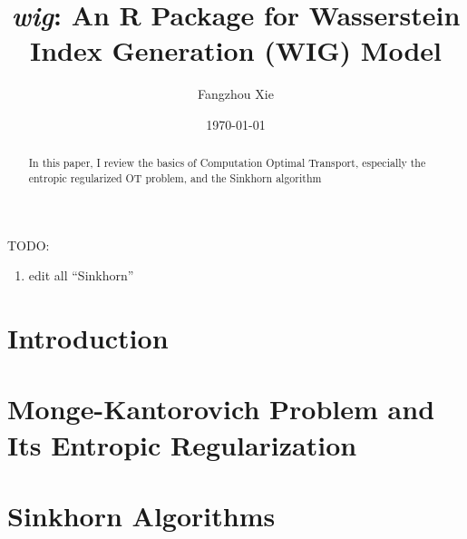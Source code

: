 \documentclass[oneside,12pt,letterpaper]{article}
\title{\textit{\textbf{wig}}: An R Package for Wasserstein Index Generation (WIG) Model}
\author{Fangzhou Xie}
\affil{Department of Economics, Rutgers University}
\date{\today}
\begin{document}
\maketitle



\begin{abstract}
  In this paper, I review the basics of Computation Optimal Transport, especially the entropic regularized OT problem,
  and the Sinkhorn algorithm
\end{abstract}

TODO: {
\color{red}
\begin{enumerate}
  \item edit all ``Sinkhorn''
\end{enumerate}
}


\newpage


\tableofcontents
\newpage


\section{Introduction}





\section{Monge-Kantorovich Problem and Its Entropic Regularization}\label{sec:review}



\section{Sinkhorn Algorithms}\label{sec:sinkhorn-algorithm}

\end{document}
